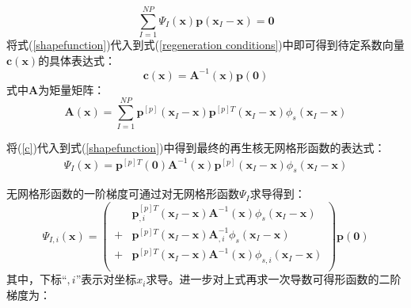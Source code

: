 \begin{equation}\label{regeneration conditions}
    \sum_{I=1}^{N\!P}\Psi_I(\pmb{x})\pmb{p}(\pmb{x}_I-\pmb{x})=\pmb{0}
\end{equation}
将式(\ref{shapefunction})代入到式(\ref{regeneration conditions})中即可得到待定系数向量$\pmb{c}(\pmb{x})$的具体表达式：
\begin{equation}\label{c}
    \pmb{c}(\pmb{x})=\pmb{A}^{-1}(\pmb{x})\pmb{p}(\pmb{0})
\end{equation}
式中$\pmb{A}$为矩量矩阵：
\begin{equation}
        \pmb{A}(\pmb{x})=\sum_{I=1}^{N\!P}\pmb{p}^{[p]}(\pmb{x}_I-\pmb{x})\pmb{p}^{[p]T}(\pmb{x}_I-\pmb{x})\phi_s(\pmb{x}_I-\pmb{x})
\end{equation}\par
将(\ref{c})代入到式(\ref{shapefunction})中得到最终的再生核无网格形函数的表达式：
\begin{equation}\label{Pshapefunction}
\begin{split}
        \Psi_I(\pmb{x})=\pmb{p}^{[p]T}(\pmb{0})\pmb{A}^{-1}(\pmb{x})\pmb{p}^{[p]}(\pmb{x}_I-\pmb{x})\phi_s(\pmb{x}_I-\pmb{x})
\end{split}
\end{equation}\par
无网格形函数的一阶梯度可通过对无网格形函数$\Psi_I$求导得到：
\begin{equation}
    \Psi_{I,i}(\pmb{x})=\left ( \begin{aligned}
    &\pmb p_{,i}^{[p]T}(\pmb x_I-\pmb x)\pmb A^{-1}(\pmb x)\phi_s(\pmb x_I-\pmb x)\\
    +&\pmb p^{[p]T}(\pmb x_I-\pmb x)\pmb A_{,i}^{-1}\phi_s(\pmb x_I-\pmb x)\\
    +&\pmb p^{[p]T}(\pmb x_I-\pmb x)\pmb A^{-1}(\pmb x)\phi _{s,i}(\pmb x_I-\pmb x)\\
    \end{aligned} \right)
    \pmb p(\pmb 0)
\end{equation}
其中，下标“$,i$”表示对坐标$x_i$求导。进一步对上式再求一次导数可得形函数的二阶梯度为：
